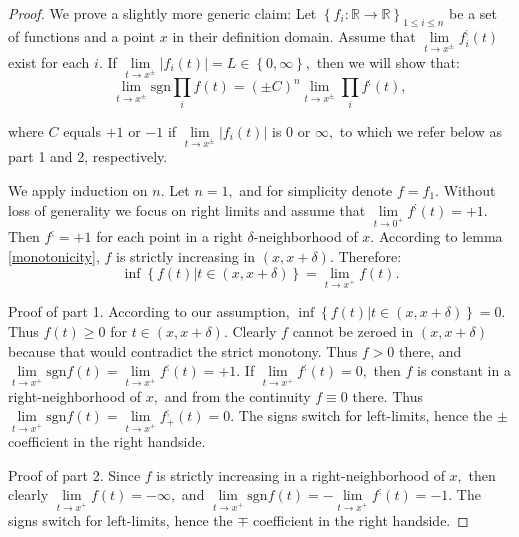 \documentclass[11pt]{book}
\begin{document}
\begin{proof}
We prove a slightly more generic claim: Let $\left\{ f_{i}:\mathbb{R}\rightarrow\mathbb{R}\right\} _{1\leq i\leq n}$ be a set of functions and a point $x$ in their definition domain. Assume that $\underset{t\rightarrow x^{\pm}}{\lim}f_{i}^{;}\left(t\right)$ exist for each $i.$ If $\underset{t\rightarrow x^{\pm}}{\lim}\left|f_{i}\left(t\right)\right|=L\in\left\{ 0,\infty\right\},$ then we will show that:
$$\underset{t\rightarrow x^{\pm}}{\lim}\text{sgn}\underset{i}{\prod}f\left(t\right)=\left(\pm C\right)^{n}\underset{t\rightarrow x^{\pm}}{\lim}\underset{i}{\prod}f^{;}\left(t\right),$$

where $C$ equals $+1$ or $-1$ if $\underset{t\rightarrow x^{\pm}}{\lim}\left|f_{i}\left(t\right)\right|$ is $0$ or $\infty,$ to which we refer below as part 1 and 2, respectively.

We apply induction on $n.$ Let $n=1,$ and for simplicity denote $f=f_{1}.$ Without loss of generality we focus on right limits and assume that $\underset{t\rightarrow0^{+}}{\lim}f^{;}\left(t\right)=+1.$ Then $f^{;}=+1$ for each point in a right $\delta$-neighborhood of $x.$ According to lemma \ref{monotonicity}, $f$ is strictly increasing in $\left(x,x+\delta\right).$ Therefore:
$$\inf\left\{ f\left(t\right)|t\in\left(x,x+\delta\right)\right\} =\underset{t\rightarrow x^{+}}{\lim}f\left(t\right).$$

Proof of part 1. According to our assumption, $\inf\left\{ f\left(t\right)|t\in\left(x,x+\delta\right)\right\} = 0.$ Thus $f\left(t\right)\geq0$ for $t\in\left(x,x+\delta\right).$ Clearly $f$ cannot be zeroed in $\left(x,x+\delta\right)$ because that would contradict the strict monotony. Thus $f>0$ there, and $\underset{t\rightarrow x^{+}}{\lim}\text{sgn}f\left(t\right)=\underset{t\rightarrow x^{+}}{\lim}f^{;}\left(t\right)=+1.$ If $\underset{t\rightarrow x^{+}}{\lim}f^{;}\left(t\right)=0,$ then $f$ is constant in a right-neighborhood of $x,$ and from the continuity $f\equiv0$ there. Thus $\underset{t\rightarrow x^{+}}{\lim}\text{sgn}f\left(t\right)=\underset{t\rightarrow x^{+}}{\lim}f_{+}^{;}\left(t\right)=0.$ The signs switch for left-limits, hence the $\pm$ coefficient in the right handside.

Proof of part 2. Since $f$ is strictly increasing in a right-neighborhood of $x,$ then clearly $\underset{t\rightarrow x^{+}}{\lim}f\left(t\right)=-\infty,$ and $\underset{t\rightarrow x^{+}}{\lim}\text{sgn}f\left(t\right)=-\underset{t\rightarrow x^{+}}{\lim}f^{;}\left(t\right)=-1.$ The signs switch for left-limits, hence the $\mp$ coefficient in the right handside.


\end{proof}
\end{document}

